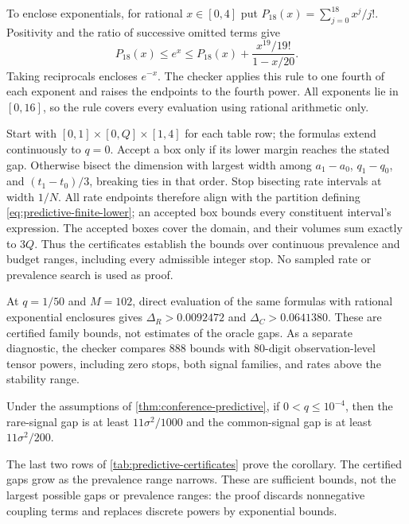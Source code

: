 \documentclass{alt2027}
\begin{document}
To enclose exponentials, for rational $x \in[0,4]$ put
$P_{18}(x) = \sum_{j=0}^{18}x^j/j!$. Positivity and the ratio of successive
omitted terms give
\begin{equation}
  P_{18}(x) \leq e^x \leq P_{18}(x) + \frac{x^{19}/19!}{1 - x/20}.
\end{equation}
Taking reciprocals encloses $e^{-x}$. The checker applies this rule to one
fourth of each exponent and raises the endpoints to the fourth power. All
exponents lie in $[0,16]$, so the rule covers every evaluation using rational
arithmetic only.

Start with $[0,1] \times[0,Q] \times[1,4]$ for each table row; the formulas
extend continuously to $q = 0$. Accept a box only if its lower margin reaches
the stated gap. Otherwise bisect the dimension with largest width among
$a_1 - a_0$, $q_1 - q_0$, and $(t_1 - t_0)/3$, breaking ties in that order. Stop
bisecting rate intervals at width $1/N$. All rate endpoints therefore align with
the partition defining \cref{eq:predictive-finite-lower}; an accepted box bounds
every constituent interval's expression. The accepted boxes cover the domain,
and their volumes sum exactly to $3Q$. Thus the certificates establish the
bounds over continuous prevalence and budget ranges, including every admissible
integer stop. No sampled rate or prevalence search is used as proof.

At $q = 1/50$ and $M = 102$, direct evaluation of the same formulas with
rational exponential enclosures gives $\Delta_R > 0.0092472$ and
$\Delta_C > 0.0641380$. These are certified family bounds, not estimates of the
oracle gaps. As a separate diagnostic, the checker compares 888 bounds with
80-digit observation-level tensor powers, including zero stops, both signal
families, and rates above the stability range.

\begin{corollary}
  Under the assumptions of \cref{thm:conference-predictive}, if
  $0 < q \leq 10^{-4}$, then the rare-signal gap is at least $11\sigma^2/1000$
  and the common-signal gap is at least $11\sigma^2/200$.
\end{corollary}

The last two rows of \cref{tab:predictive-certificates} prove the corollary. The
certified gaps grow as the prevalence range narrows. These are sufficient
bounds, not the largest possible gaps or prevalence ranges: the proof discards
nonnegative coupling terms and replaces discrete powers by exponential bounds.
\end{document}
